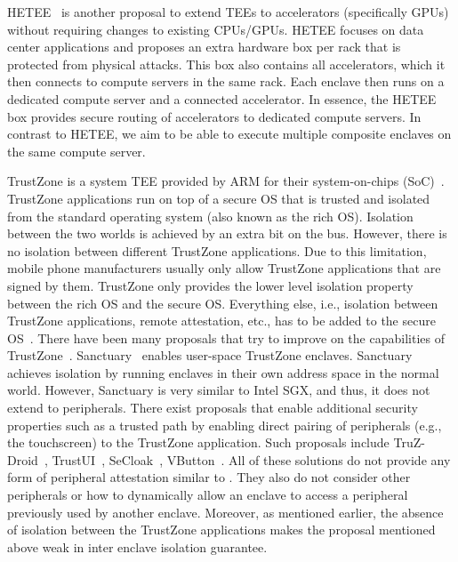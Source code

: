  HETEE~\cite{zhu2020hetee} is another proposal to extend TEEs to accelerators (specifically GPUs) without requiring changes to existing CPUs/GPUs. HETEE focuses on data center applications and proposes an extra hardware box per rack that is protected from physical attacks. This box also contains all accelerators, which it then connects to compute servers in the same rack. Each enclave then runs on a dedicated compute server and a connected accelerator. In essence, the HETEE box provides secure routing of accelerators to dedicated compute servers. In contrast to HETEE, we aim to be able to execute multiple composite enclaves on the same compute server. 


 TrustZone is a system TEE provided by ARM for their system-on-chips (SoC)~\cite{winter2008trusted}. TrustZone applications run on top of a secure OS that is trusted and isolated from the standard operating system (also known as the rich OS). Isolation between the two worlds is achieved by an extra bit on the bus. 
However, there is no isolation between different TrustZone applications. Due to this limitation, mobile phone manufacturers usually only allow TrustZone applications that are signed by them. %
TrustZone only provides the lower level isolation property between the rich OS and the secure OS. Everything else, i.e., isolation between TrustZone applications, remote attestation, etc., has to be added to the secure OS~\cite{ning2014samsungknox}. There have been many proposals that try to improve on the capabilities of TrustZone~\cite{brasser2019sanctuary,hua2017vtz}. Sanctuary~\cite{brasser2019sanctuary} enables user-space TrustZone enclaves. Sanctuary achieves isolation by running enclaves in their own address space in the normal world. However, Sanctuary is very similar to Intel SGX, and thus, it does not extend to peripherals.
There exist proposals that enable additional security properties such as a trusted path by enabling direct pairing of peripherals (e.g., the touchscreen) to the TrustZone application. Such proposals include TruZ-Droid~\cite{TruZ-Droid}, TrustUI~\cite{trustUI}, SeCloak~\cite{SeCloak}, VButton~\cite{VButton}. All of these solutions do not provide any form of peripheral attestation similar to \name{}. They also do not consider other peripherals or how to dynamically allow an enclave to access a peripheral previously used by another enclave. Moreover, as mentioned earlier, the absence of isolation between the TrustZone applications makes the proposal mentioned above weak in inter enclave isolation guarantee.


